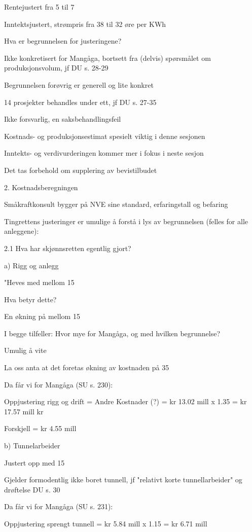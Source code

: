 \documentclass[12pt,a4paper]{article} %
\begin{document}
	Rentejustert fra 5 til 7 %

	Inntektsjustert, strømpris fra 38 til 32 øre per KWh 

	Hva er begrunnelsen for justeringene?

	Ikke konkretisert for Mangåga, bortsett fra (delvis) spørsmålet om produksjonsvolum, jf DU s. 28-29

	Begrunnelsen forøvrig er generell og lite konkret

	14 prosjekter behandles under ett, jf DU s. 27-35

	Ikke forsvarlig, en saksbehandlingsfeil

	Kostnads- og produksjonsestimat spesielt viktig i denne sesjonen

	Inntekts- og verdivurderingen kommer mer i fokus i neste sesjon

	Det tas forbehold om supplering av bevistilbudet

2.	Kostnadsberegningen

	Småkraftkonsult bygger på NVE sine standard, erfaringstall og befaring

	Tingrettens justeringer er umulige å forstå i lys av begrunnelsen (felles for alle anleggene):

2.1 	Hva har skjønnsretten egentlig gjort?

a)	Rigg og anlegg	

	"Heves med mellom 15 %
	
	Hva betyr dette? 
	
	En økning på mellom 15 %
	
	I begge tilfeller: Hvor mye for Mangåga, og med hvilken begrunnelse?
	
	Umulig å vite

	La oss anta at det foretas økning av kostnaden på 35 %

	Da får vi for Mangåga (SU s. 230):

	Oppjustering rigg og drift = Andre Kostnader (?) = kr 13.02 mill x 1.35 = kr 17.57 mill kr

	Forskjell = kr 4.55 mill
	
b)	Tunnelarbeider

	Justert opp med 15 %

	Gjelder formodentlig ikke boret tunnell, jf "relativt korte tunnellarbeider" og drøftelse DU s. 30

	Da får vi for Mangåga (SU s. 231):

	Oppjustering sprengt tunnell = kr 5.84 mill x 1.15 = kr 6.71 mill	
\end{document}
